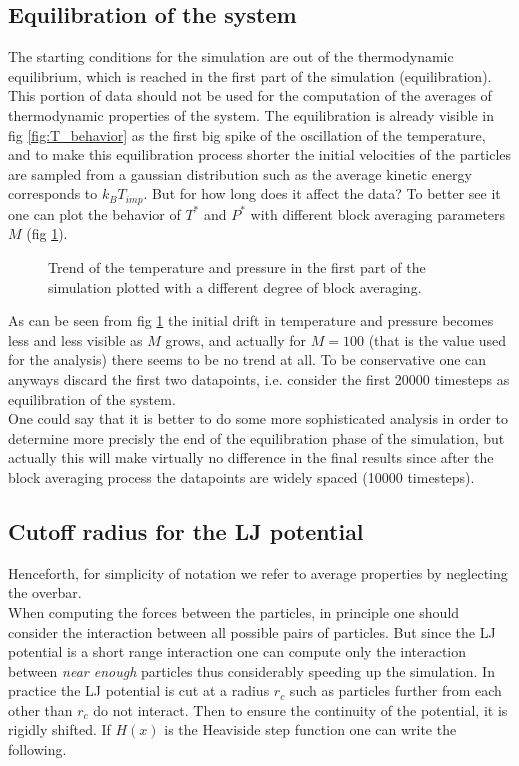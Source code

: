 \documentclass[a4paper, 11pt]{article}
\begin{document}
  \subsection{Equilibration of the system}
    The starting conditions for the simulation are out of the thermodynamic equilibrium, which is reached in the first part of the simulation (equilibration). This portion of data should not be used for the computation of the averages of thermodynamic properties of the system. The equilibration is already visible in fig \ref{fig:T_behavior} as the first big spike of the oscillation of the temperature, and to make this equilibration process shorter the initial velocities of the particles are sampled from a gaussian distribution such as the average kinetic energy corresponds to $k_B T_{imp}$. But for how long does it affect the data? To better see it one can plot the behavior of $T^*$ and $P^*$ with different block averaging parameters $M$ (fig \ref{fig:equilibration}).

    \begin{figure}[H]
      \centering
       \hspace{-0.5cm}
      \caption{Trend of the temperature and pressure in the first part of the simulation plotted with a different degree of block averaging.}
      \label{fig:equilibration}
    \end{figure}

    As can be seen from fig \ref{fig:equilibration} the initial drift in temperature and pressure becomes less and less visible as $M$ grows, and actually for $M = 100$ (that is the value used for the analysis) there seems to be no trend at all. To be conservative one can anyways discard the first two datapoints, i.e. consider the first 20000 timesteps as equilibration of the system. \\
    One could say that it is better to do some more sophisticated analysis in order to determine more precisly the end of the equilibration phase of the simulation, but actually this will make virtually no difference in the final results since after the block averaging process the datapoints are widely spaced (10000 timesteps).

  \subsection{Cutoff radius for the LJ potential}
    Henceforth, for simplicity of notation we refer to average properties by neglecting the overbar. \\
    When computing the forces between the particles, in principle one should consider the interaction between all possible pairs of particles. But since the LJ potential is a short range interaction one can compute only the interaction between \emph{near enough} particles thus considerably speeding up the simulation. In practice the LJ potential is cut at a radius $r_c$ such as particles further from each other than $r_c$ do not interact. Then to ensure the continuity of the potential, it is rigidly shifted. If $H(x)$ is the Heaviside step function one can write the following.
\end{document}
